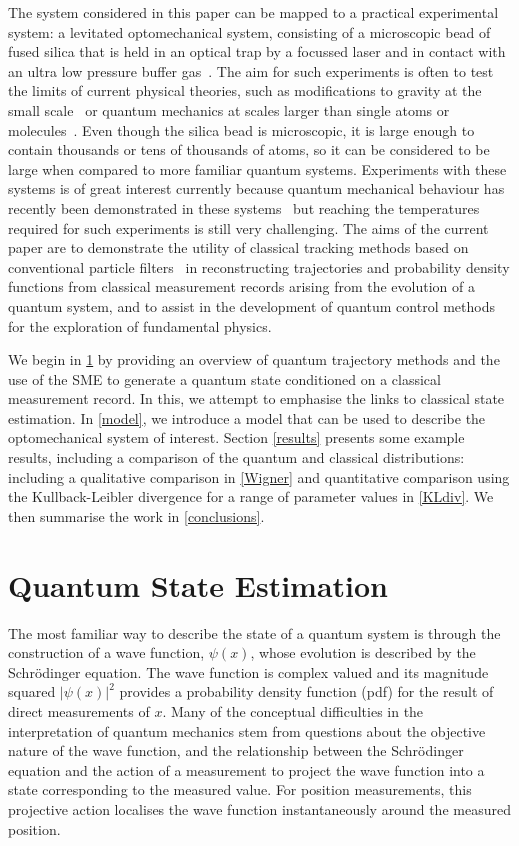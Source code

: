 \documentclass[conference]{IEEEtran}
\begin{document}
The system considered in this paper can be mapped to a practical experimental system: a levitated optomechanical system, consisting of a microscopic bead of fused silica that is held in an optical trap by a focussed laser and in contact with an ultra low pressure buffer gas~\cite{Ash1970,Man1998,Gan1999,Vul2000,Mud2016,Set2018}. The aim for such experiments is often to test the limits of current physical theories, such as modifications to gravity at the small scale~\cite{Ger2010,Arv2013} or quantum mechanics at scales larger than single atoms or molecules~\cite{Bas2003,Bas2013,Ber2015}. Even though the silica bead is microscopic, it is large enough to contain thousands or tens of thousands of atoms, so it can be considered to be large when compared to more familiar quantum systems. Experiments with these systems is of great interest currently because quantum mechanical behaviour has recently been demonstrated in these systems~\cite{Del2020} but reaching the temperatures required for such experiments is still very challenging. The aims of the current paper are to demonstrate the utility of classical tracking methods based on conventional particle filters~\cite{Gor1993,Dou2001,Aru2002} in reconstructing trajectories and probability density functions from classical measurement records arising from the evolution of a quantum system, and to assist in the development of quantum control methods for the exploration of fundamental physics. 

We begin in \ref{qse} by providing an overview of quantum trajectory methods and the use of the SME to generate a quantum state conditioned on a classical measurement record. In this, we attempt to emphasise the links to classical state estimation. In \ref{model}, we introduce a model that can be used to describe the optomechanical system of interest. Section \ref{results} presents some example results, including a comparison of the quantum and classical distributions: including a qualitative comparison in \ref{Wigner} and quantitative comparison using the Kullback-Leibler divergence for a range of parameter values in \ref{KLdiv}. We then summarise the work in \ref{conclusions}.

\section{Quantum State Estimation}\label{qse}

The most familiar way to describe the state of a quantum system is through the construction of a wave function, $\psi(x)$, whose evolution is described by the Schr\"{o}dinger equation. The wave function is complex valued and its magnitude squared $|\psi(x)|^2$ provides a probability density function (pdf) for the result of direct measurements of $x$. Many of the conceptual difficulties in the interpretation of quantum mechanics stem from questions about the objective nature of the wave function, and the relationship between the Schr\"{o}dinger equation and the action of a measurement to project the wave function into a state corresponding to the measured value. For position measurements, this projective action localises the wave function instantaneously around the measured position. 
\end{document}
